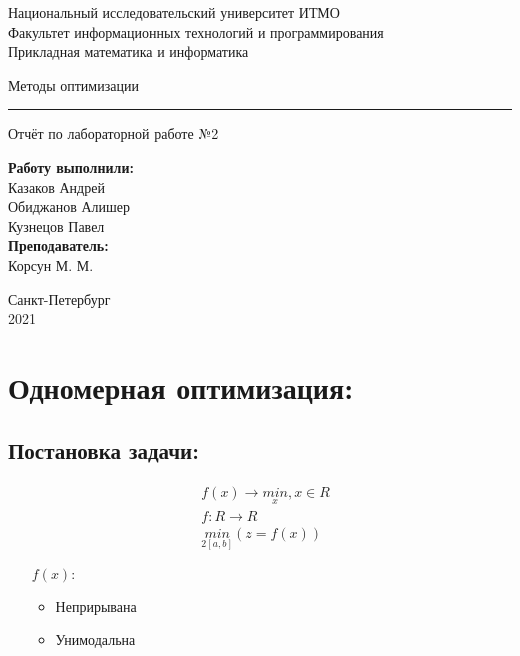 \documentclass[fleqn]{article}
\begin{document}
    \begin{center}
    Национальный исследовательский университет ИТМО \\
    Факультет информационных технологий и программирования \\
    Прикладная математика и информатика
\end{center}
\vspace{20em}
\begin{center}
    {\Large Методы оптимизации}
    \vspace{3pt}
    \hrule
    \vspace{3pt}
    Отчёт по лабораторной работе №2
\end{center}
\vspace{20em}
\begin{flushright}
\textbf{ Работу выполнили: } \\
Казаков Андрей \\
Обиджанов Алишер \\
Кузнецов Павел \\
\vspace{1em}
\textbf{ Преподаватель: } \\
Корсун М. М.
\end{flushright}
\vspace{12em}
\begin{center}
    Санкт-Петербург \\
    2021
\end{center}

\newpage

\section*{Одномерная оптимизация:}
\subsection*{Постановка задачи:}
\begin{align*}
    &f(x) \rightarrow \underset{x}{min}, x \in R\\
    &f: R \rightarrow R\\
    &\underset{2[a,b]}{min}(z=f(x))
\end{align*}

\begin{itemize}
    \item [$f(x):$]
    \begin{itemize}
        \item Неприрывана
        \item Унимодальна
    \end{itemize}
\end{itemize}
\end{document}
